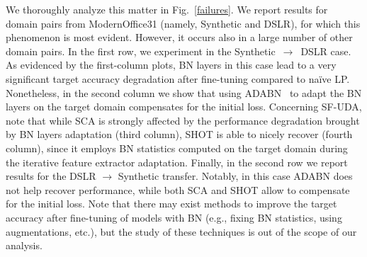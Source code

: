 \documentclass{article}
\begin{document}
We 
thoroughly
analyze this matter in Fig.~\ref{failures}.
We report results for domain pairs from  ModernOffice31 (namely, Synthetic and DSLR), for which this phenomenon is most evident. 
However, it occurs also in a large number of other domain pairs.
In 
the first row, we experiment in the  Synthetic~$\to$~DSLR case. 
As evidenced by the first-column plots, BN layers in this case lead to 
a very significant target accuracy degradation after fine-tuning compared to na\"ive LP. Nonetheless, in the second column we show that using 
ADABN~\citep{li2016revisiting} 
to adapt the BN layers on the target domain 
compensates for the initial loss.
Concerning SF-UDA, note that while SCA is strongly affected by the performance degradation brought by BN layers adaptation (third column), SHOT is able to 
nicely
recover (fourth column), since it employs BN statistics computed on the target domain during the iterative
feature extractor adaptation. 
Finally, in the second row we report results for the  DSLR $\to$ Synthetic transfer. 
Notably, in this case ADABN  does not help recover performance, while both SCA and SHOT allow to compensate for the initial loss. 
Note that there may exist methods to improve the target accuracy after fine-tuning of models with BN (e.g., fixing BN statistics, using augmentations, etc.), but the study of these techniques is out of the scope of our analysis. 
\end{document}
